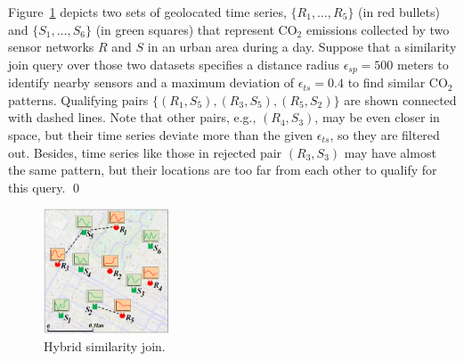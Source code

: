 \begin{myexample}
Figure~\ref{fig:simjoin_example} depicts two sets of geolocated time series, $\{R_1, \dots, R_5\}$ (in red bullets) and $\{S_1, \dots, S_6\}$ (in green squares) that represent CO$_2$ emissions collected by two sensor networks $R$ and $S$ in an urban area during a day. Suppose that a similarity join query over those two datasets specifies a distance radius $\epsilon_{sp} = 500$ meters to identify nearby sensors and a maximum deviation of $\epsilon_{ts} = 0.4$ to find similar CO$_2$ patterns. Qualifying pairs  $\{ (R_1, S_5), (R_3, S_5),  (R_5, S_2) \}$ are shown connected with dashed lines. Note that other pairs, e.g., $(R_4, S_3)$, may be even closer in space, but their time series deviate more than the given $\epsilon_{ts}$, so they are filtered out. Besides, time series like those in rejected pair $(R_3, S_3)$ may have almost the same pattern, but their locations are too far from each other to qualify for this query.
\qed
\end{myexample}

\begin{figure}[!tb]
 \centering
 \includegraphics[width=0.33\textwidth]{figures/sim_join.png}
 \caption{Hybrid similarity join.}
\label{fig:simjoin_example}
\end{figure}